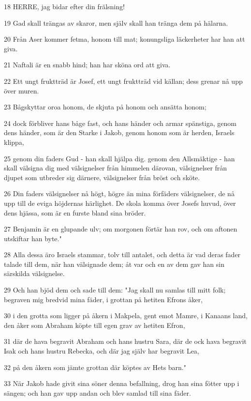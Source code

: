 \par 18 HERRE, jag bidar efter din frälsning!
\par 19 Gad skall trängas av skaror, men själv skall han tränga dem på hälarna.
\par 20 Från Aser kommer fetma, honom till mat; konungsliga läckerheter har han att giva.
\par 21 Naftali är en snabb hind; han har sköna ord att giva.
\par 22 Ett ungt fruktträd är Josef, ett ungt fruktträd vid källan; dess grenar nå upp över muren.
\par 23 Bågskyttar oroa honom, de skjuta på honom och ansätta honom;
\par 24 dock förbliver hans båge fast, och hans händer och armar spänstiga, genom dens händer, som är den Starke i Jakob, genom honom som är herden, Israels klippa,
\par 25 genom din faders Gud - han skall hjälpa dig. genom den Allsmäktige - han skall välsigna dig med välsignelser från himmelen därovan, välsignelser från djupet som utbreder sig därnere, välsignelser från bröst och sköte.
\par 26 Din faders välsignelser nå högt, högre än mina förfäders välsignelser, de nå upp till de eviga höjdernas härlighet. De skola komma över Josefs huvud, över dens hjässa, som är en furste bland sina bröder.
\par 27 Benjamin är en glupande ulv; om morgonen förtär han rov, och om aftonen utskiftar han byte."
\par 28 Alla dessa äro Israels stammar, tolv till antalet, och detta är vad deras fader talade till dem, när han välsignade dem; åt var och en av dem gav han sin särskilda välsignelse.
\par 29 Och han bjöd dem och sade till dem: "Jag skall nu samlas till mitt folk; begraven mig bredvid mina fäder, i grottan på hetiten Efrons åker,
\par 30 i den grotta som ligger på åkern i Makpela, gent emot Mamre, i Kanaans land, den åker som Abraham köpte till egen grav av hetiten Efron,
\par 31 där de hava begravit Abraham och hans hustru Sara, där de ock hava begravit Isak och hans hustru Rebecka, och där jag själv har begravit Lea,
\par 32 på den åkern som jämte grottan där köptes av Hets barn."
\par 33 När Jakob hade givit sina söner denna befallning, drog han sina fötter upp i sängen; och han gav upp andan och blev samlad till sina fäder.

